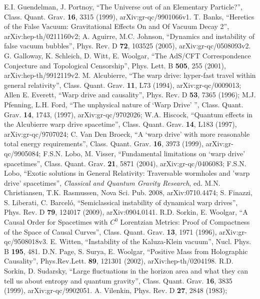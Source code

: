 \documentclass{article}
\begin{document}
\begin{thebibliography}{99}
E.I. Guendelman, J. Portnoy, ``The Universe out of an Elementary Particle?'', Class. Quant. Grav. \textbf{16}, 3315 (1999),
 arXiv:gr-qc/9901066v1.
T. Banks, ``Heretics of the False Vacuum: Gravitational Effects On and Of Vacuum Decay 2'', arXiv:hep-th/0211160v2;
A. Aguirre, M.C. Johnson, ``Dynamics and instability of false vacuum bubbles'', Phys. Rev. D \textbf{72}, 103525 (2005), arXiv:gr-qc/0508093v2.
G. Galloway, K. Schleich, D. Witt, E. Woolgar, ``The AdS/CFT Correspondence Conjecture and Topological Censorship'', Phys. Lett. B \textbf{505}, 255 (2001), arXiv:hep-th/9912119v2.
M. Alcubierre, ``The warp drive: hyper-fast travel within general relativity'', Class. Quant. Grav. \textbf{11}, L73 (1994),  	arXiv:gr-qc/0009013; Allen E. Everett, ``Warp drive and causality'', Phys. Rev. D \textbf{53}, 7365 (1996); M.J. Pfenning, L.H. Ford, ``The unphysical nature of `Warp Drive' '', Class. Quant. Grav. \textbf{14}, 1743, (1997), arXiv:gr-qc/9702026; W.A. Hiscock, ``Quantum effects in the Alcubierre warp drive spacetime'', Class. Quant. Grav. \textbf{14}, L183 (1997), arXiv:gr-qc/9707024; C. Van Den Broeck, ``A `warp drive' with more reasonable total energy requirements'',  Class. Quant. Grav. \textbf{16}, 3973 (1999), arXiv:gr-qc/9905084; F.S.N. Lobo, M. Visser, ``Fundamental limitations on `warp drive' spacetimes'', Class. Quant. Grav. \textbf{21}, 5871 (2004), arXiv:gr-qc/0406083; F.S.N. Lobo, ``Exotic solutions in General Relativity: Traversable wormholes and 'warp drive' spacetimes'', \textit{Classical and Quantum Gravity Research}, ed. M.N. Christiansen, T.K. Rasmussen, Nova Sci. Pub. 2008,  arXiv:0710.4474; S. Finazzi, S. Liberati, C. Barcel\'{o}, ``Semiclassical instability of dynamical warp drives'', Phys. Rev. D \textbf{79}, 124017 (2009), arXiv:0904.0141.
R.D. Sorkin, E. Woolgar, ``A Causal Order for Spacetimes with $C^0$ Lorentzian Metrics: Proof of Compactness of the Space of Causal Curves'', Class. Quant. Grav. \textbf{13}, 1971 (1996), arXiv:gr-qc/9508018v3.
E. Witten, ``Instability of the Kaluza-Klein vacuum'', Nucl. Phys. B \textbf{195}, 481.
D.N. Page, S. Surya, E. Woolgar, ``Positive Mass from Holographic Causality'', Phys.Rev.Lett. \textbf{89}, 121301 (2002),  	arXiv:hep-th/0204198.
R.D. Sorkin, D. Sudarsky, ``Large fluctuations in the horizon area and what they can tell us about entropy and quantum gravity'', Class. Quant. Grav. \textbf{16}, 3835 (1999), arXiv:gr-qc/9902051.
A. Vilenkin, Phys. Rev. D \textbf{27}, 2848 (1983);

\end{thebibliography}
\end{document}
